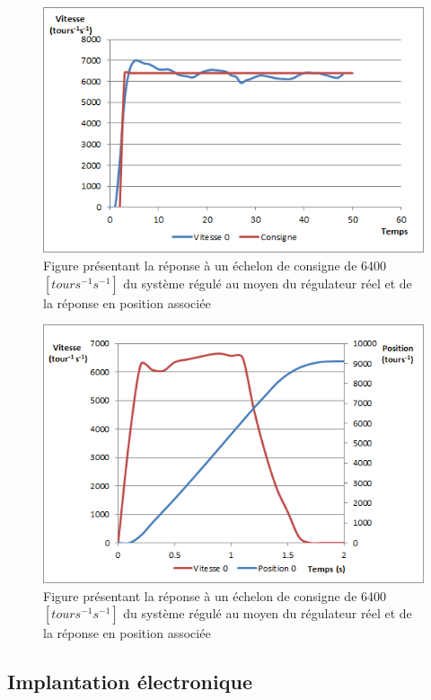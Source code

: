 \begin{figure}[htbp]
\centering
\includegraphics[scale=0.6]{fig/asservissement_3.png}
\caption{Figure présentant la réponse à un échelon de consigne de 6400$\left[tours^{-1}s^{-1}\right]$ du système régulé au moyen du régulateur réel et de la réponse en position associée}
\label{fig:as_2}
\end{figure}
\begin{figure}[htbp]
\centering
\includegraphics[scale=0.6]{fig/asservissement_2.png}
\caption{Figure présentant la réponse à un échelon de consigne de 6400$\left[tours^{-1}s^{-1}\right]$ du système régulé au moyen du régulateur réel et de la réponse en position associée}
\label{fig:as_3}
\end{figure}
\subsection{Implantation électronique}
